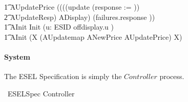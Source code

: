 \begin{circus}
%
        \t1 AUpdatePrice \circdef ((((update \then (response := \emptyset)) \circseq \\
            \t2 AUpdateResp) \circseq ADisplay) \circseq (failures.response \then \Skip)) \\
%
    \t1 AInit \circdef Init \circseq (\Interleave u: ESID  \circspot offdisplay.u \then \Skip) \\
%
	\t1 \circspot AInit \circseq (\circmu X \circspot (AUpdatemap \extchoice ANewPrice \extchoice AUpdatePrice) \circseq X) \\
%
	\circend
\end{circus}

\paragraph{System}
The ESEL Specification is simply the $Controller$ process.
\begin{circus}
    \circprocess\ ESELSpec \circdef  Controller
\end{circus}
